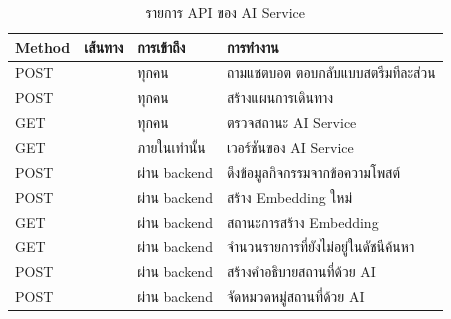 \begin{table}[H]
\caption{รายการ API ของ AI Service}
\label{tab:api-ai}
\centering
\small
\begin{tabular}{|C{1.5cm}|L{4.4cm}|L{2.6cm}|L{\dimexpr\linewidth-8.5cm-8\arrayrulewidth\relax}|}
\hline
\textbf{Method} & \textbf{เส้นทาง} & \textbf{การเข้าถึง} & \textbf{การทำงาน} \\ \hline
POST &  & ทุกคน & ถามแชตบอต ตอบกลับแบบสตรีมทีละส่วน \\ \hline
POST &  & ทุกคน & สร้างแผนการเดินทาง \\ \hline
GET &  & ทุกคน & ตรวจสถานะ AI Service \\ \hline
GET &  & ภายในเท่านั้น & เวอร์ชันของ AI Service \\ \hline
POST &  & ผ่าน backend & ดึงข้อมูลกิจกรรมจากข้อความโพสต์ \\ \hline
POST &  & ผ่าน backend & สร้าง Embedding ใหม่ \\ \hline
GET &  & ผ่าน backend & สถานะการสร้าง Embedding \\ \hline
GET &  & ผ่าน backend & จำนวนรายการที่ยังไม่อยู่ในดัชนีค้นหา \\ \hline
POST &  & ผ่าน backend & สร้างคำอธิบายสถานที่ด้วย AI \\ \hline
POST &  & ผ่าน backend & จัดหมวดหมู่สถานที่ด้วย AI \\ \hline
\end{tabular}
\end{table}
